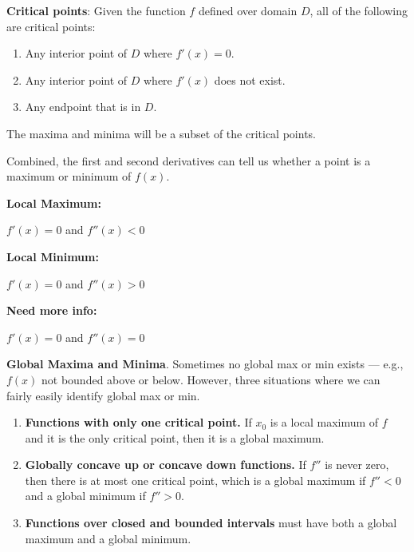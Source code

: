\documentclass[20pt]{extarticle}
\newcommand{\be}{\begin{enumerate}}
\newcommand{\ee}{\end{enumerate}}
\newcommand{\pbt}{\parbox[t]{2in}}
\begin{document}
\item {\bf Critical points}: Given the function $f$ defined over domain
      $D$, all of the following are critical points:
      \be
      \item Any interior point of $D$ where $f'(x)=0$.
      \item Any interior point of $D$ where $f'(x)$ does not exist.
      \item Any endpoint that is in $D$.
      \ee

The maxima and minima will be a subset of the critical points.

\item  Combined, the first and second derivatives can tell us whether a
 point is a maximum or minimum of $f(x)$. \\[6pt]
 \pbt{\bf Local Maximum:} $f'(x)=0$ and $f''(x)<0$\\
 \pbt{\bf Local Minimum:} $f'(x)=0$ and $f''(x)>0$\\
 \pbt{\bf Need more info:} $f'(x)=0$ and $f''(x)=0$

\item {\bf Global Maxima and Minima}. Sometimes no global max or min
 exists --- e.g., $f(x)$ not bounded above or below.  However, three
 situations where we can fairly easily identify global max or min.
   \be
   \item {\bf Functions with only one critical point.} If $x_0$ is a local
    maximum of $f$ and it is the only critical point, then it is a global
    maximum.
   \item {\bf Globally concave up or concave down functions.}  If $f''$
    is never zero, then there is at most one critical point, which is a
    global maximum if $f''<0$ and a global minimum if $f''>0$.
   \item {\bf Functions over closed and bounded intervals} must have both
    a global maximum and a global minimum.
   \ee
\end{document}

